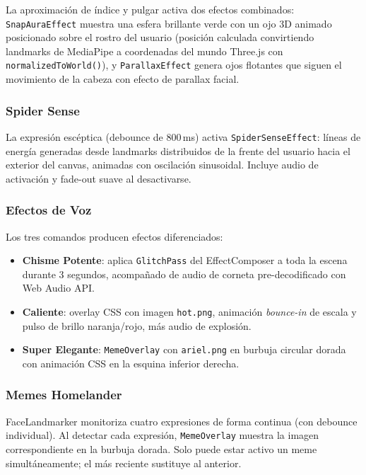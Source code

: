 \documentclass[11pt]{article}
\begin{document}
La aproximación de índice y pulgar activa dos efectos combinados: \texttt{SnapAuraEffect} muestra una esfera brillante verde con un ojo 3D animado posicionado sobre el rostro del usuario (posición calculada convirtiendo landmarks de MediaPipe a coordenadas del mundo Three.js con \texttt{normalizedToWorld()}), y \texttt{ParallaxEffect} genera ojos flotantes que siguen el movimiento de la cabeza con efecto de parallax facial.

\subsubsection{Spider Sense}

La expresión escéptica (debounce de 800\,ms) activa \texttt{SpiderSenseEffect}: líneas de energía generadas desde landmarks distribuidos de la frente del usuario hacia el exterior del canvas, animadas con oscilación sinusoidal. Incluye audio de activación y fade-out suave al desactivarse.

\subsubsection{Efectos de Voz}

Los tres comandos producen efectos diferenciados:
\begin{itemize}
    \item \textbf{Chisme Potente}: aplica \texttt{GlitchPass} del EffectComposer a toda la escena durante 3 segundos, acompañado de audio de corneta pre-decodificado con Web Audio API.
    \item \textbf{Caliente}: overlay CSS con imagen \texttt{hot.png}, animación \textit{bounce-in} de escala y pulso de brillo naranja/rojo, más audio de explosión.
    \item \textbf{Super Elegante}: \texttt{MemeOverlay} con \texttt{ariel.png} en burbuja circular dorada con animación CSS en la esquina inferior derecha.
\end{itemize}

\subsubsection{Memes Homelander}

FaceLandmarker monitoriza cuatro expresiones de forma continua (con debounce individual). Al detectar cada expresión, \texttt{MemeOverlay} muestra la imagen correspondiente en la burbuja dorada. Solo puede estar activo un meme simultáneamente; el más reciente sustituye al anterior.
\end{document}
